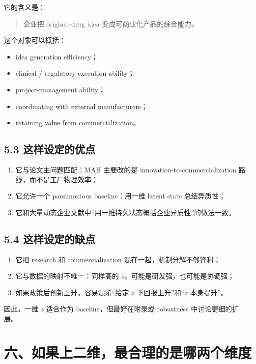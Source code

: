 \documentclass[12pt]{ctexart}
\begin{document}
它的含义是：

\begin{quote}
企业把 original-drug idea 变成可商业化产品的综合能力。
\end{quote}

这个对象可以概括：

\begin{itemize}[leftmargin=2em]
    \item idea generation efficiency；
    \item clinical / regulatory execution ability；
    \item project-management ability；
    \item coordinating with external manufacturers；
    \item retaining value from commercialization。
\end{itemize}

\subsection{5.3 这样设定的优点}

\begin{enumerate}[leftmargin=2em]
    \item 它与论文主问题匹配：MAH 主要改的是 innovation-to-commercialization 路线，而不是工厂物理效率；
    \item 它允许一个 parsimonious baseline：用一维 latent state 总结异质性；
    \item 它和大量动态企业文献中“用一维持久状态概括企业异质性”的做法一致。
\end{enumerate}

\subsection{5.4 这样设定的缺点}

\begin{enumerate}[leftmargin=2em]
    \item 它把 research 和 commercialization 混在一起，机制分解不够锋利；
    \item 它与数据的映射不唯一：同样高的 \(z\)，可能是研发强，也可能是协调强；
    \item 如果政策后创新上升，容易混淆“给定 \(z\) 下回报上升”和“\(z\) 本身提升”。
\end{enumerate}

因此，一维 \(z\) 适合作为 baseline，但最好在附录或 robustness 中讨论更细的扩展。

\section{六、如果上二维，最合理的是哪两个维度}
\end{document}
